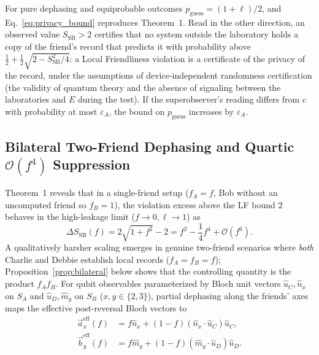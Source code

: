 For pure dephasing and equiprobable outcomes $p_{\mathrm{guess}} = (1 + \ell)/2$, and Eq.~\eqref{eq:privacy_bound} reproduces Theorem~1. Read in the other direction, an observed value $S_{\mathrm{SB}} > 2$ certifies that no system outside the laboratory holds a copy of the friend's record that predicts it with probability above $\tfrac{1}{2} + \tfrac{1}{2}\sqrt{2 - S_{\mathrm{SB}}^2/4}$: a Local Friendliness violation is a certificate of the privacy of the record, under the assumptions of device-independent randomness certification (the validity of quantum theory and the absence of signaling between the laboratories and $E$ during the test). If the superobserver's reading differs from $c$ with probability at most $\varepsilon_A$, the bound on $p_{\mathrm{guess}}$ increases by $\varepsilon_A$.

\subsection{Bilateral Two-Friend Dephasing and Quartic $\mathcal{O}(f^4)$ Suppression}

Theorem~1 reveals that in a single-friend setup ($f_A = f$, Bob without an uncomputed friend so $f_B = 1$), the violation excess above the LF bound $2$ behaves in the high-leakage limit ($f \to 0, \ell \to 1$) as
\begin{equation}
    \Delta S_{\mathrm{SB}}(f) = 2\sqrt{1 + f^2} - 2 = f^2 - \frac{1}{4}f^4 + \mathcal{O}(f^6).
    \label{eq:sb_quadratic}
\end{equation}
A qualitatively harsher scaling emerges in genuine two-friend scenarios where \emph{both} Charlie and Debbie establish local records ($f_A = f_B = f$); Proposition~\ref{prop:bilateral} below shows that the controlling quantity is the product $f_A f_B$. For qubit observables parameterized by Bloch unit vectors $\hat{u}_C, \hat{n}_x$ on $S_A$ and $\hat{u}_D, \hat{m}_y$ on $S_B$ ($x, y \in \{2, 3\}$), partial dephasing along the friends' axes maps the effective post-reversal Bloch vectors to
\begin{align}
    \vec{a}_x^{\mathrm{eff}}(f) &= f \hat{n}_x + (1 - f)(\hat{n}_x \cdot \hat{u}_C)\hat{u}_C, \nonumber \\
    \vec{b}_y^{\mathrm{eff}}(f) &= f \hat{m}_y + (1 - f)(\hat{m}_y \cdot \hat{u}_D)\hat{u}_D.
    \label{eq:bloch_dephase}
\end{align}

